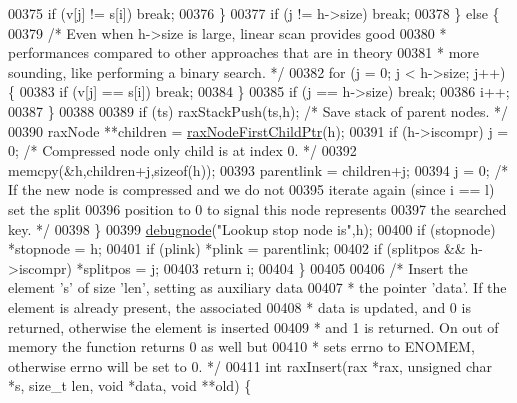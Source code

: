 \begin{DoxyCode}
{{00375                 \textcolor{keywordflow}{if} (v[j] != s[i]) \textcolor{keywordflow}{break};
00376             \}
00377             \textcolor{keywordflow}{if} (j != h->size) \textcolor{keywordflow}{break};
00378         \} \textcolor{keywordflow}{else} \{
00379             \textcolor{comment}{/* Even when h->size is large, linear scan provides good}
00380 \textcolor{comment}{             * performances compared to other approaches that are in theory}
00381 \textcolor{comment}{             * more sounding, like performing a binary search. */}
00382             \textcolor{keywordflow}{for} (j = 0; j < h->size; j++) \{
00383                 \textcolor{keywordflow}{if} (v[j] == s[i]) \textcolor{keywordflow}{break};
00384             \}
00385             \textcolor{keywordflow}{if} (j == h->size) \textcolor{keywordflow}{break};
00386             i++;
00387         \}
00388 
00389         \textcolor{keywordflow}{if} (ts) raxStackPush(ts,h); \textcolor{comment}{/* Save stack of parent nodes. */}
00390         raxNode **children = \hyperlink{rax_8c_aa94163a0d02b30219ef18e5a3ea06ca6}{raxNodeFirstChildPtr}(h);
00391         \textcolor{keywordflow}{if} (h->iscompr) j = 0; \textcolor{comment}{/* Compressed node only child is at index 0. */}
00392         memcpy(&h,children+j,\textcolor{keyword}{sizeof}(h));
00393         parentlink = children+j;
00394         j = 0; \textcolor{comment}{/* If the new node is compressed and we do not}
00395 \textcolor{comment}{                  iterate again (since i == l) set the split}
00396 \textcolor{comment}{                  position to 0 to signal this node represents}
00397 \textcolor{comment}{                  the searched key. */}
00398     \}
00399     \hyperlink{rax_8c_a622b73fbdc398cdbfa8cc1fb87283cb4}{debugnode}(\textcolor{stringliteral}{"Lookup stop node is"},h);
00400     \textcolor{keywordflow}{if} (stopnode) *stopnode = h;
00401     \textcolor{keywordflow}{if} (plink) *plink = parentlink;
00402     \textcolor{keywordflow}{if} (splitpos && h->iscompr) *splitpos = j;
00403     \textcolor{keywordflow}{return} i;
00404 \}
00405 
00406 \textcolor{comment}{/* Insert the element 's' of size 'len', setting as auxiliary data}
00407 \textcolor{comment}{ * the pointer 'data'. If the element is already present, the associated}
00408 \textcolor{comment}{ * data is updated, and 0 is returned, otherwise the element is inserted}
00409 \textcolor{comment}{ * and 1 is returned. On out of memory the function returns 0 as well but}
00410 \textcolor{comment}{ * sets errno to ENOMEM, otherwise errno will be set to 0. */}
00411 \textcolor{keywordtype}{int} raxInsert(rax *rax, \textcolor{keywordtype}{unsigned} \textcolor{keywordtype}{char} *s, size\_t len, \textcolor{keywordtype}{void} *data, \textcolor{keywordtype}{void} **old) \{
}}
\end{DoxyCode}
